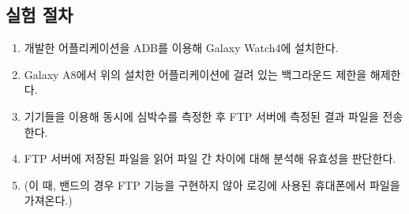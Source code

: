 \documentclass[11pt]{article}
\begin{document}
    \subsection*{실험 절차}
    \hspace{0cm}
    \begin{enumerate}
        \item 개발한 어플리케이션을 ADB를 이용해 Galaxy Watch4에 설치한다.
        \item Galaxy A8에서 위의 설치한 어플리케이션에 걸려 있는 백그라운드 제한을 해제한다.
        \item 기기들을 이용해 동시에 심박수를 측정한 후 FTP 서버에 측정된 결과 파일을 전송한다.
        \item FTP 서버에 저장된 파일을 읽어 파일 간 차이에 대해 분석해 유효성을 판단한다.
        \item[] \hspace{0.5cm}(이 때, 밴드의 경우 FTP 기능을 구현하지 않아 로깅에 사용된 휴대폰에서 파일을 가져온다.) 
    \end{enumerate}
\end{document}
